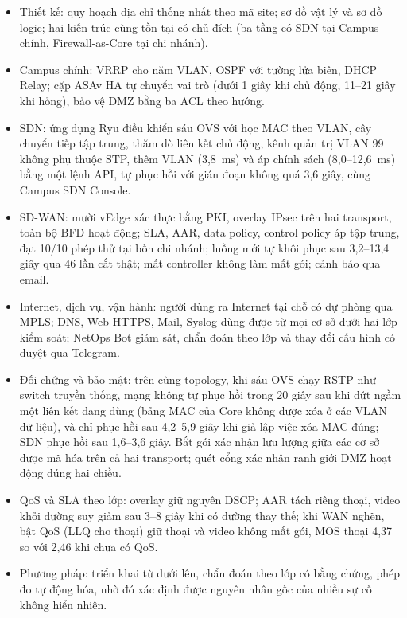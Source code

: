 \begin{itemize}
    \item Thiết kế: quy hoạch địa chỉ thống nhất theo mã site; sơ đồ vật lý và sơ đồ logic; hai kiến trúc cùng tồn tại có chủ đích (ba tầng có SDN tại Campus chính, Firewall-as-Core tại chi nhánh).
    \item Campus chính: VRRP cho năm VLAN, OSPF với tường lửa biên, DHCP Relay; cặp ASAv HA tự chuyển vai trò (dưới 1 giây khi chủ động, 11--21 giây khi hỏng), bảo vệ DMZ bằng ba ACL theo hướng.
    \item SDN: ứng dụng Ryu điều khiển sáu OVS với học MAC theo VLAN, cây chuyển tiếp tập trung, thăm dò liên kết chủ động, kênh quản trị VLAN 99 không phụ thuộc STP, thêm VLAN (3,8~ms) và áp chính sách (8,0--12,6~ms) bằng một lệnh API, tự phục hồi với gián đoạn không quá 3,6 giây, cùng Campus SDN Console.
    \item SD-WAN: mười vEdge xác thực bằng PKI, overlay IPsec trên hai transport, toàn bộ BFD hoạt động; SLA, AAR, data policy, control policy áp tập trung, đạt 10/10 phép thử tại bốn chi nhánh; luồng mới tự khôi phục sau 3,2--13,4 giây qua 46 lần cắt thật; mất controller không làm mất gói; cảnh báo qua email.
    \item Internet, dịch vụ, vận hành: người dùng ra Internet tại chỗ có dự phòng qua MPLS; DNS, Web HTTPS, Mail, Syslog dùng được từ mọi cơ sở dưới hai lớp kiểm soát; NetOps Bot giám sát, chẩn đoán theo lớp và thay đổi cấu hình có duyệt qua Telegram.
    \item Đối chứng và bảo mật: trên cùng topology, khi sáu OVS chạy RSTP như switch truyền thống, mạng không tự phục hồi trong 20 giây sau khi đứt ngầm một liên kết đang dùng (bảng MAC của Core không được xóa ở các VLAN dữ liệu), và chỉ phục hồi sau 4,2--5,9 giây khi giả lập việc xóa MAC đúng; SDN phục hồi sau 1,6--3,6 giây. Bắt gói xác nhận lưu lượng giữa các cơ sở được mã hóa trên cả hai transport; quét cổng xác nhận ranh giới DMZ hoạt động đúng hai chiều.
    \item QoS và SLA theo lớp: overlay giữ nguyên DSCP; AAR tách riêng thoại, video khỏi đường suy giảm sau 3--8 giây khi có đường thay thế; khi WAN nghẽn, bật QoS (LLQ cho thoại) giữ thoại và video không mất gói, MOS thoại 4,37 so với 2,46 khi chưa có QoS.
    \item Phương pháp: triển khai từ dưới lên, chẩn đoán theo lớp có bằng chứng, phép đo tự động hóa, nhờ đó xác định được nguyên nhân gốc của nhiều sự cố không hiển nhiên.
\end{itemize}

